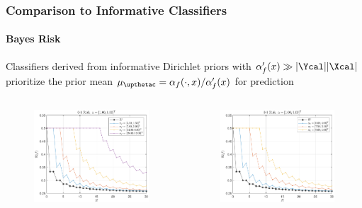 \documentclass[aspectratio=169]{beamer}
\begin{document}
\begin{frame}
\frametitle{Comparison to Informative Classifiers}
\framesubtitle{Bayes Risk}

Classifiers derived from informative Dirichlet priors with $\alpha_f'(x) \gg |\Ycal||\Xcal|$ prioritize the prior mean $\mu_{\upthetac} = \alpha_f(\cdot,x) / \alpha_f'(x)$ for prediction

\vspace{-0.5em}
\begin{columns}[T]

\begin{column}{.5\linewidth}

\begin{figure}
\centering
\includegraphics[width=0.8\linewidth]{Risk_01_Dir_N_leg_f_a0.pdf}
\label{fig:Risk_01_Dir_N_leg_f_a0}
\end{figure}
\vspace{-2.5em}
\centering
\footnotesize

\end{column}

\begin{column}{.5\linewidth}

\begin{figure}
\centering
\includegraphics[width=0.8\linewidth]{Risk_01_Dir_N_leg_f_mu.pdf}
\label{fig:Risk_01_Dir_N_leg_f_mu}
\end{figure}
\vspace{-2.5em}
\centering
\footnotesize


\end{column}
\end{columns}
\end{frame}
\end{document}
